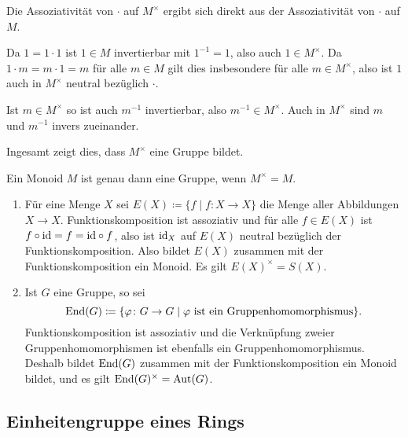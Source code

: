 Die Assoziativität von $\cdot$ auf $M^\times$ ergibt sich direkt aus der Assoziativität von $\cdot$ auf $M$.

Da $1 = 1 \cdot 1$ ist $1 \in M$ invertierbar mit $1^{-1} = 1$, also auch $1 \in M^\times$. Da $1 \cdot m = m \cdot 1 = m$ für alle $m \in M$ gilt dies insbesondere für alle $m \in M^\times$, also ist $1$ auch in $M^\times$ neutral bezüglich $\cdot$.

Ist $m \in M^\times$ so ist auch $m^{-1}$ invertierbar, also $m^{-1} \in M^\times$. Auch in $M^\times$ sind $m$ und $m^{-1}$ invers zueinander.

Ingesamt zeigt dies, dass $M^\times$ eine Gruppe bildet.

\begin{bem}
 Ein Monoid $M$ ist genau dann eine Gruppe, wenn $M^\times = M$.
\end{bem}

\begin{bsp}
 \begin{enumerate}[leftmargin=*]
  \item
   Für eine Menge $X$ sei $E(X) \coloneqq \{f \mid f \colon X \to X\}$ die Menge aller Abbildungen $X \to X$. Funktionskomposition ist assoziativ und für alle $f \in E(X)$ ist $f \circ \mathrm{id} = f = \mathrm{id} \circ f$, also ist $\mathrm{id}_X$ auf $E(X)$ neutral bezüglich der Funktionskomposition. Also bildet $E(X)$ zusammen mit der Funktionskomposition ein Monoid. Es gilt $E(X)^\times = S(X)$.
  \item
   Ist $G$ eine Gruppe, so sei
   \[
    \mathrm{End}(G) \coloneqq \{ \varphi \colon G \to G \mid \text{$\varphi$ ist ein Gruppenhomomorphismus} \}.
   \]
   Funktionskomposition ist assoziativ und die Verknüpfung zweier Gruppenhomomorphismen ist ebenfalls ein Gruppenhomomorphismus. Deshalb bildet $\mathrm{End}(G)$ zusammen mit der Funktionskomposition ein Monoid bildet, und es gilt $\mathrm{End}(G)^\times = \mathrm{Aut}(G)$.
 \end{enumerate}
\end{bsp}






\subsection{Einheitengruppe eines Rings}











